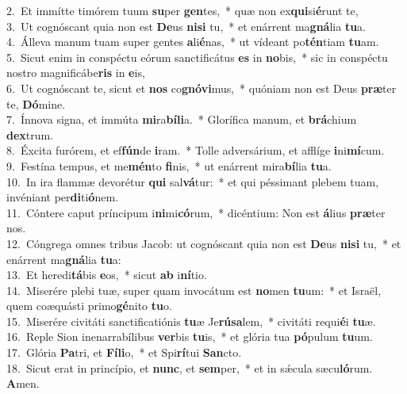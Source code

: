 {2.~}Et immítte timórem tuum \textbf{su}per \textbf{gen}tes,~* quæ non ex\textbf{qui}si\textbf{é}runt te,\\
{3.~}Ut cognóscant quia non est \textbf{De}us \textbf{ni}\textbf{si} tu,~* et enárrent ma\textbf{gná}lia \textbf{tu}a.\\
{4.~}Álleva manum tuam super gentes \textbf{a}li\textbf{é}nas,~* ut vídeant po\textbf{tén}tiam \textbf{tu}am.\\
{5.~}Sicut enim in conspéctu eórum sanctificátus \textbf{es} in \textbf{no}bis,~* sic in conspéctu nostro magnificábe\textbf{ris} in \textbf{e}is,\\
{6.~}Ut cognóscant te, sicut et \textbf{nos} co\textbf{gnó}\textbf{vi}mus,~* quóniam non est Deus \textbf{præ}ter te, \textbf{Dó}mine.\\
{7.~}Ínnova signa, et immúta \textbf{mi}ra\textbf{bí}\textbf{li}a.~* Glorífica manum, et \textbf{brá}chium \textbf{dex}trum.\\
{8.~}Éxcita furórem, et ef\textbf{fún}de \textbf{i}ram.~* Tolle adversárium, et afflíge \textbf{i}ni\textbf{mí}cum.\\
{9.~}Festína tempus, et me\textbf{mén}to \textbf{fi}nis,~* ut enárrent mira\textbf{bí}lia \textbf{tu}a.\\
{10.~}In ira flammæ devorétur \textbf{qui} sal\textbf{vá}tur:~* et qui péssimant plebem tuam, invéniant per\textbf{di}ti\textbf{ó}nem.\\
{11.~}Cóntere caput príncipum i\textbf{ni}mi\textbf{có}rum,~* dicéntium: Non est \textbf{á}lius \textbf{præ}ter nos.\\
{12.~}Cóngrega omnes tribus Jacob: ut cognóscant quia non est \textbf{De}us \textbf{ni}\textbf{si} tu,~* et enárrent ma\textbf{gná}lia \textbf{tu}a:\\
{13.~}Et heredi\textbf{tá}bis \textbf{e}os,~* sicut \textbf{ab} i\textbf{ní}tio.\\
{14.~}Miserére plebi tuæ, super quam invocátum est \textbf{no}men \textbf{tu}um:~* et Israël, quem coæquásti primo\textbf{gé}nito \textbf{tu}o.\\
{15.~}Miserére civitáti sanctificatiónis \textbf{tu}æ Je\textbf{rú}\textbf{sa}lem,~* civitáti requi\textbf{é}i \textbf{tu}æ.\\
{16.~}Reple Sion inenarrabílibus \textbf{ver}bis \textbf{tu}is,~* et glória tua \textbf{pó}pulum \textbf{tu}um.\\
{17.~}Glória \textbf{Pa}tri, et \textbf{Fí}\textbf{li}o,~* et Spi\textbf{rí}tui \textbf{San}cto.\\
{18.~}Sicut erat in princípio, et \textbf{nunc}, et \textbf{sem}per,~* et in sǽcula sæcu\textbf{ló}rum. \textbf{A}men.\\
